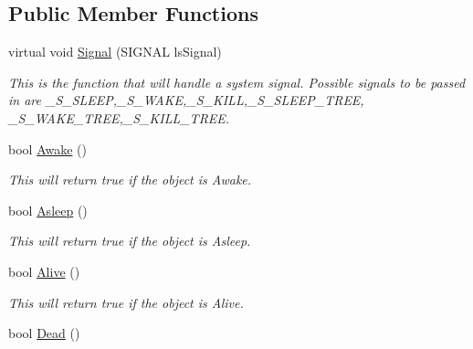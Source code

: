 \subsection*{Public Member Functions}
\begin{DoxyCompactItemize}
\item 
\hypertarget{classc_signal_a545074be1da41d00050bed3cd2fb2305}{
virtual void \hyperlink{classc_signal_a545074be1da41d00050bed3cd2fb2305}{Signal} (SIGNAL lsSignal)}
\label{classc_signal_a545074be1da41d00050bed3cd2fb2305}

\begin{DoxyCompactList}\small\item\em This is the function that will handle a system signal. Possible signals to be passed in are \_\-S\_\-SLEEP,\_\-S\_\-WAKE,\_\-S\_\-KILL,\_\-S\_\-SLEEP\_\-TREE, \_\-S\_\-WAKE\_\-TREE,\_\-S\_\-KILL\_\-TREE. \end{DoxyCompactList}\item 
\hypertarget{classc_signal_a64e6fb4aee9b3a6bee5b56c7b86294cd}{
bool \hyperlink{classc_signal_a64e6fb4aee9b3a6bee5b56c7b86294cd}{Awake} ()}
\label{classc_signal_a64e6fb4aee9b3a6bee5b56c7b86294cd}

\begin{DoxyCompactList}\small\item\em This will return true if the object is Awake. \end{DoxyCompactList}\item 
\hypertarget{classc_signal_a90286da3e933e6fe2560fd0dfec777b2}{
bool \hyperlink{classc_signal_a90286da3e933e6fe2560fd0dfec777b2}{Asleep} ()}
\label{classc_signal_a90286da3e933e6fe2560fd0dfec777b2}

\begin{DoxyCompactList}\small\item\em This will return true if the object is Asleep. \end{DoxyCompactList}\item 
\hypertarget{classc_signal_aff5636e7aacacc05512c121610e3ec5e}{
bool \hyperlink{classc_signal_aff5636e7aacacc05512c121610e3ec5e}{Alive} ()}
\label{classc_signal_aff5636e7aacacc05512c121610e3ec5e}

\begin{DoxyCompactList}\small\item\em This will return true if the object is Alive. \end{DoxyCompactList}\item 
\hypertarget{classc_signal_a85f403bacc2e87bb16f4282bd145484b}{
bool \hyperlink{classc_signal_a85f403bacc2e87bb16f4282bd145484b}{Dead} ()}
\label{classc_signal_a85f403bacc2e87bb16f4282bd145484b}


\end{DoxyCompactItemize}
